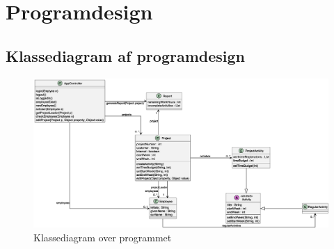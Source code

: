 \section{Programdesign}
\subsection{Klassediagram af programdesign}
\begin{figure}[H]
    \centering
    \caption{Klassediagram over programmet}\label{fig:ClassDiag}
    \includegraphics[width = \textwidth]{Diagrams/ClassDiagram.eps}
\end{figure}\newpage
